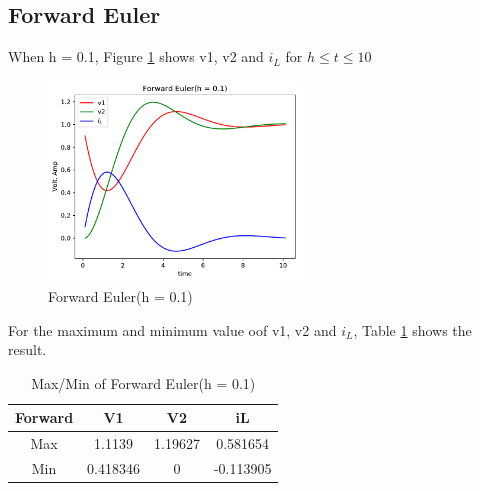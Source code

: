 \documentclass{article}
\begin{document}
\subsection{Forward Euler}
When h = 0.1, Figure \ref{fig:for 01} shows v1, v2 and $i_L$ for $h \leq t \leq 10$
\begin{figure}[H]
    \centering
    \includegraphics[width=0.6\textwidth]{src/for_01.pdf}
    \caption{Forward Euler(h = 0.1)}
    \label{fig:for 01}
\end{figure}
For the maximum and minimum value oof v1, v2 and $i_L$, Table \ref{tab:for 01} shows the result.
\begin{table}[H]
    \begin{center}
        \begin{tabular}{|c|c|c|c|}
            \hline
            Forward & V1 & V2 & iL \\ \hline
            Max & 1.1139 & 1.19627 & 0.581654 \\ \hline
            Min & 0.418346 & 0 & -0.113905 \\ \hline
        \end{tabular}
    \end{center}
    \caption{Max/Min of Forward Euler(h = 0.1)}
    \label{tab:for 01}
\end{table}
\end{document}
